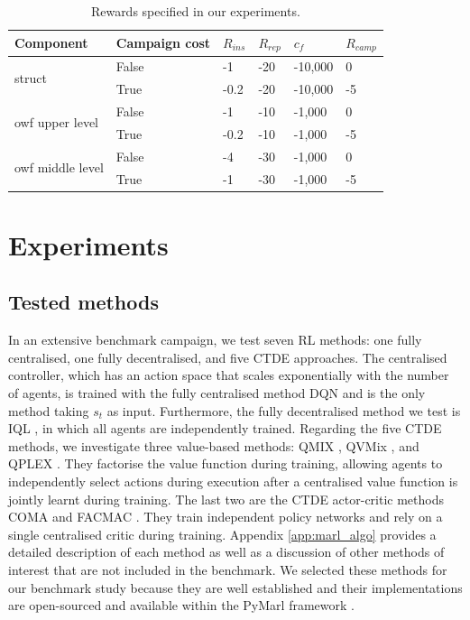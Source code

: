 \begin{table}
\centering
\caption{Rewards specified in our experiments.}
\label{tab:rewards_det}
\begin{tabular}{llllll}
\toprule
Component & Campaign cost & $R_{ins}$ & $R_{rep}$ &  $c_f$ & $R_{camp}$ \\
\bottomrule
\multirow{2}{*}{struct} &  False & -1 & -20 & -10,000 & 0  \\ 
& True & -0.2 & -20 & -10,000 & -5   \\
\bottomrule
\multirow{2}{*}{owf upper level} & False & -1 & -10 & -1,000 & 0     \\
& True  & -0.2 & -10 & -1,000 & -5     \\
\multirow{2}{*}{owf middle level} & False & -4 & -30 & -1,000 & 0    \\
& True & -1 & -30 & -1,000 & -5    \\
\bottomrule
\end{tabular}
\end{table}


\section{Experiments}\label{sec:ch5_experiments}

\subsection{Tested methods}
\label{sec:tested_method}
In an extensive benchmark campaign, we test seven RL methods: one fully centralised, one fully decentralised, and five CTDE approaches.
The centralised controller, which has an action space that scales exponentially with the number of agents, is trained with the fully centralised method DQN \citep{Mnih2015} and is the only method taking $s_t$ as input.
Furthermore, the fully decentralised method we test is IQL \citep{Tan1993}, in which all agents are independently trained.
Regarding the five CTDE methods, we investigate three value-based methods: QMIX \citep{Rashid2018}, QVMix \citep{leroy2020qvmix}, and QPLEX \citep{wang2021qplex}.
They factorise the value function during training, allowing agents to independently select actions during execution after a centralised value function is jointly learnt during training.
The last two are the CTDE actor-critic methods COMA \citep{Foerster2017} and FACMAC \citep{peng2021facmac}.
They train independent policy networks and rely on a single centralised critic during training.
Appendix \ref{app:marl_algo} provides a detailed description of each method as well as a discussion of other methods of interest that are not included in the benchmark.
We selected these methods for our benchmark study because they are well established and their implementations are open-sourced and available within the PyMarl framework \citep{samvelyan2019starcraft}.

